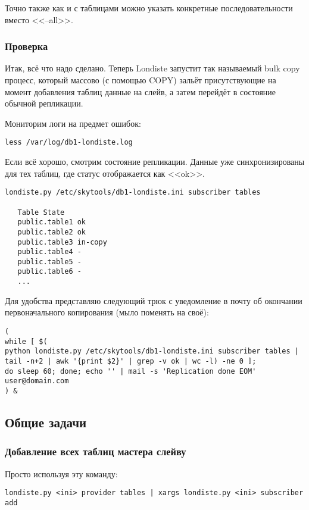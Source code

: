 Точно также как и с таблицами можно указать конкретные последовательности вместо <<--all>>.

\subsubsection{Проверка}
Итак, всё что надо сделано. Теперь Londiste запустит так называемый bulk copy
процесс, который массово (с помощью COPY) зальёт присутствующие на момент
добавления таблиц данные на слейв, а затем перейдёт в состояние обычной репликации.

Мониторим логи на предмет ошибок:
\begin{lstlisting}[label=lst:londiste17,caption=Проверка]
less /var/log/db1-londiste.log
\end{lstlisting}

Если всё хорошо, смотрим состояние репликации. Данные уже синхронизированы для
тех таблиц, где статус отображается как <<ok>>.
\begin{lstlisting}[label=lst:londiste18,caption=Проверка]
londiste.py /etc/skytools/db1-londiste.ini subscriber tables

   Table State
   public.table1 ok
   public.table2 ok
   public.table3 in-copy
   public.table4 -
   public.table5 -
   public.table6 -
   ...
\end{lstlisting}

Для удобства представляю следующий трюк с уведомление в почту об окончании
первоначального копирования (мыло поменять на своё):
\begin{lstlisting}[label=lst:londiste19,caption=Проверка]
(
while [ $(
python londiste.py /etc/skytools/db1-londiste.ini subscriber tables |
tail -n+2 | awk '{print $2}' | grep -v ok | wc -l) -ne 0 ];
do sleep 60; done; echo '' | mail -s 'Replication done EOM' user@domain.com
) &
\end{lstlisting}


\subsection{Общие задачи}

\subsubsection{Добавление всех таблиц мастера слейву}
Просто используя эту команду:
\begin{lstlisting}[label=lst:londiste20,caption=Добавление всех таблиц мастера слейву]
londiste.py <ini> provider tables | xargs londiste.py <ini> subscriber add
\end{lstlisting}

